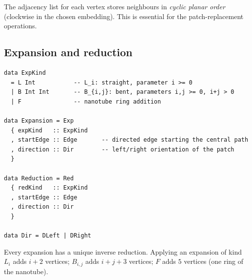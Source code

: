 \documentclass[11pt,a4paper]{article}
\theoremstyle{definition}
\begin{document}
The adjacency list for each vertex stores neighbours in \emph{cyclic
planar order} (clockwise in the chosen embedding).  This is essential
for the patch-replacement operations.

\subsection{Expansion and reduction}
\label{sec:expansion-types}

\begin{lstlisting}
data ExpKind
  = L Int           -- L_i: straight, parameter i >= 0
  | B Int Int       -- B_{i,j}: bent, parameters i,j >= 0, i+j > 0
  | F               -- nanotube ring addition

data Expansion = Exp
  { expKind   :: ExpKind
  , startEdge :: Edge       -- directed edge starting the central path
  , direction :: Dir        -- left/right orientation of the patch
  }

data Reduction = Red
  { redKind   :: ExpKind
  , startEdge :: Edge
  , direction :: Dir
  }

data Dir = DLeft | DRight
\end{lstlisting}

Every expansion has a unique inverse reduction.  Applying an
expansion of kind $L_i$ adds $i+2$ vertices; $B_{i,j}$ adds $i+j+3$
vertices; $F$ adds $5$ vertices (one ring of the nanotube).
\end{document}
